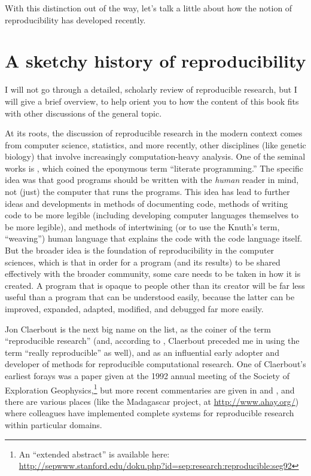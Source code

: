 \documentclass{book}
\begin{document}
With this distinction out of the way, let's talk a little about how the notion of reproducibility has developed recently.
\section{A sketchy history of reproducibility}
\label{sec-2-2}

I will not go through a detailed, scholarly review of reproducible research, but I will give a brief overview, to help orient you to how the content of this book fits with other discussions of the general topic.

At its roots, the discussion of reproducible research in the modern context comes from computer science, statistics, and more recently, other disciplines (like genetic biology) that involve increasingly computation-heavy analysis. One of the seminal works is \textcite{knuth1984literate}, which coined the eponymous term ``literate programming.'' The specific idea was that good programs should be written with the \emph{human} reader in mind, not (just) the computer that runs the programs. This idea has lead to further ideas and developments in methods of documenting code, methods of writing code to be more legible (including developing computer languages themselves to be more legible), and methods of intertwining (or to use the Knuth's term, ``weaving'') human language that explains the code with the code language itself. But the broader idea is the foundation of reproducibility in the computer sciences, which is that in order for a program (and its results) to be shared effectively with the broader community, some care needs to be taken in how it is created. A program that is opaque to people other than its creator will be far less useful than a program that can be understood easily, because the latter can be improved, expanded, adapted, modified, and debugged far more easily.

Jon Claerbout is the next big name on the list, as the coiner of the term ``reproducible research'' (and, according to \cite{buckheit1995wavelab}, Claerbout preceded me in using the term ``really reproducible'' as well), and as an influential early adopter and developer of methods for reproducible computational research.  One of Claerbout's earliest forays was a paper given at the 1992 annual meeting of the Society of Exploration Geophysics,\footnote{An ``extended abstract'' is available here:\\ \href{http://sepwww.stanford.edu/doku.php?id=sep:research:reproducible:seg92}{http://sepwww.stanford.edu/doku.php?id=sep:research:reproducible:seg92}
 } but more recent commentaries are given in \textcite{schwab2000making} and \textcite{fomel2009reproducible}, and there are various places (like the Madagascar project, at \href{http://www.ahay.org/}{http://www.ahay.org/}) where colleagues have implemented complete systems for reproducible research within particular domains.
\end{document}
